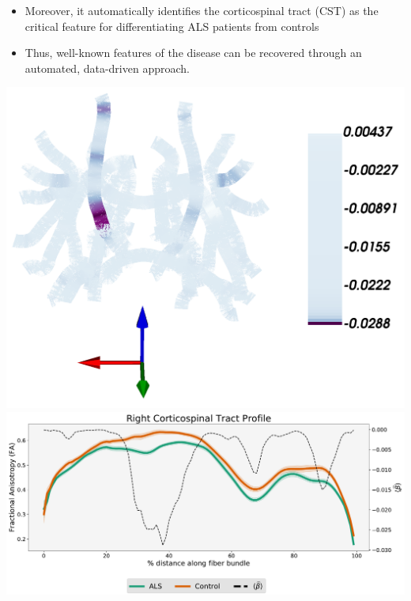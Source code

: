 \documentclass[a0paper,portrait,fontscale=0.395]{baposter}
\newenvironment{Figure}
  {\par\medskip\noindent\minipage{\linewidth}}
  {\endminipage\par\medskip}
\begin{document}
\begin{poster}
{\begin{Figure}
\end{Figure}
\begin{itemize}[noitemsep, leftmargin=*]
\item Moreover, it automatically identifies the corticospinal tract (CST) as the critical feature for differentiating ALS patients from controls
\item Thus, well-known features of the disease can be recovered through an automated, data-driven approach.
\end{itemize}
\begin{Figure}
    \centering
    \includegraphics[height=0.28\linewidth, valign=t]{classification_beta_bupu.png}
    \includegraphics[height=0.28\linewidth, valign=t]{classification_tract_profiles.pdf}
\end{Figure}
}


\end{poster}
\end{document}
